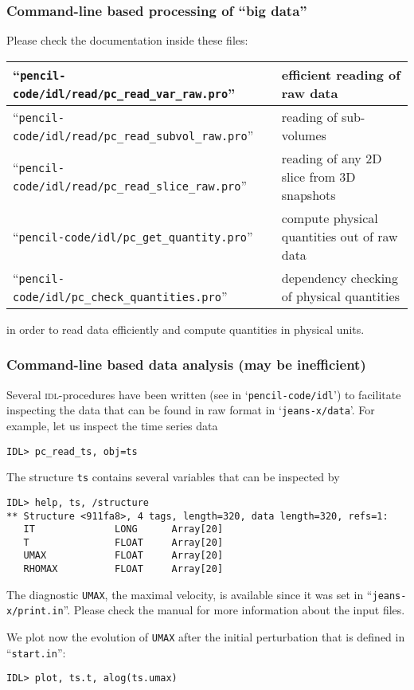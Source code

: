 \documentclass[a4paper,12pt]{article}
\newcommand{\file}[1]{``\texttt{#1}''}
\newcommand{\directory}[1]{`\texttt{#1}'}
\newcommand{\name}[1]{\textsc{#1}}
\newcommand{\code}[1]{\texttt{#1}}
\begin{document}
\subsubsection{Command-line based processing of ``big data''}
Please check the documentation inside these files:
\begin{center}
\begin{tabular}{|l|l|}\hline
  \file{pencil-code/idl/read/pc\_read\_var\_raw.pro} & efficient reading of raw data\\\hline
  \file{pencil-code/idl/read/pc\_read\_subvol\_raw.pro} & reading of sub-volumes\\\hline
  \file{pencil-code/idl/read/pc\_read\_slice\_raw.pro} & reading of any 2D slice from 3D snapshots\\\hline
  \file{pencil-code/idl/pc\_get\_quantity.pro} & compute physical quantities out of raw data\\\hline
  \file{pencil-code/idl/pc\_check\_quantities.pro} & dependency checking of physical quantities\\\hline
\end{tabular}
\end{center}
in order to read data efficiently and compute quantities in physical units.

\subsubsection{Command-line based data analysis (may be inefficient)}
Several \name{idl}-procedures have been written
(see in \directory{pencil-code/idl}) to facilitate inspecting the data
that can be found in raw format in \directory{jeans-x/data}.
For example, let us inspect the time series data
\begin{verbatim}
IDL> pc_read_ts, obj=ts
\end{verbatim}
The structure \code{ts} contains several variables that can be inspected by
\begin{verbatim}
IDL> help, ts, /structure
** Structure <911fa8>, 4 tags, length=320, data length=320, refs=1:
   IT              LONG      Array[20]
   T               FLOAT     Array[20]
   UMAX            FLOAT     Array[20]
   RHOMAX          FLOAT     Array[20]
\end{verbatim}
The diagnostic \code{UMAX}, the maximal velocity, is available since it was set
in \file{jeans-x/print.in}. Please check the manual for more information about the input files.

We plot now the evolution of \code{UMAX} after the initial perturbation that is defined in \file{start.in}:
\begin{verbatim}
IDL> plot, ts.t, alog(ts.umax)
\end{verbatim}
\end{document}
